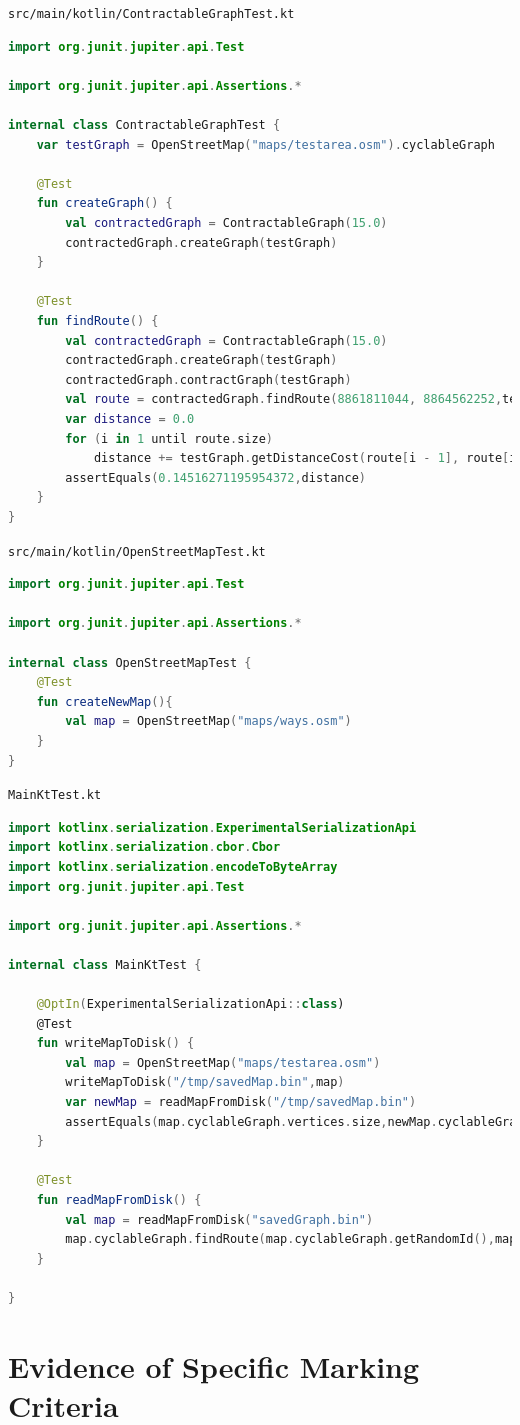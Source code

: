 \documentclass[11pt,twoside,a4paper]{report}
\begin{document}
\texttt{src/main/kotlin/ContractableGraphTest.kt}
\begin{lstlisting}[language=kotlin]
import org.junit.jupiter.api.Test

import org.junit.jupiter.api.Assertions.*

internal class ContractableGraphTest {
    var testGraph = OpenStreetMap("maps/testarea.osm").cyclableGraph

    @Test
    fun createGraph() {
        val contractedGraph = ContractableGraph(15.0)
        contractedGraph.createGraph(testGraph)
    }

    @Test
    fun findRoute() {
        val contractedGraph = ContractableGraph(15.0)
        contractedGraph.createGraph(testGraph)
        contractedGraph.contractGraph(testGraph)
        val route = contractedGraph.findRoute(8861811044, 8864562252,testGraph,false)
        var distance = 0.0
        for (i in 1 until route.size)
            distance += testGraph.getDistanceCost(route[i - 1], route[i])
        assertEquals(0.14516271195954372,distance)
    }
}
\end{lstlisting}
\texttt{src/main/kotlin/OpenStreetMapTest.kt}
\begin{lstlisting}[language=kotlin]
import org.junit.jupiter.api.Test

import org.junit.jupiter.api.Assertions.*

internal class OpenStreetMapTest {
    @Test
    fun createNewMap(){
        val map = OpenStreetMap("maps/ways.osm")
    }
}
\end{lstlisting}
\texttt{MainKtTest.kt}
\begin{lstlisting}[language=kotlin]
import kotlinx.serialization.ExperimentalSerializationApi
import kotlinx.serialization.cbor.Cbor
import kotlinx.serialization.encodeToByteArray
import org.junit.jupiter.api.Test

import org.junit.jupiter.api.Assertions.*

internal class MainKtTest {

    @OptIn(ExperimentalSerializationApi::class)
    @Test
    fun writeMapToDisk() {
        val map = OpenStreetMap("maps/testarea.osm")
        writeMapToDisk("/tmp/savedMap.bin",map)
        var newMap = readMapFromDisk("/tmp/savedMap.bin")
        assertEquals(map.cyclableGraph.vertices.size,newMap.cyclableGraph.vertices.size)
    }

    @Test
    fun readMapFromDisk() {
        val map = readMapFromDisk("savedGraph.bin")
        map.cyclableGraph.findRoute(map.cyclableGraph.getRandomId(),map.cyclableGraph.getRandomId(),10.0,2.0,false)
    }

}
\end{lstlisting}
\chapter{Evidence of Specific Marking Criteria}
\newpage
{}
\printbibliography
\label{end}
\end{document}
